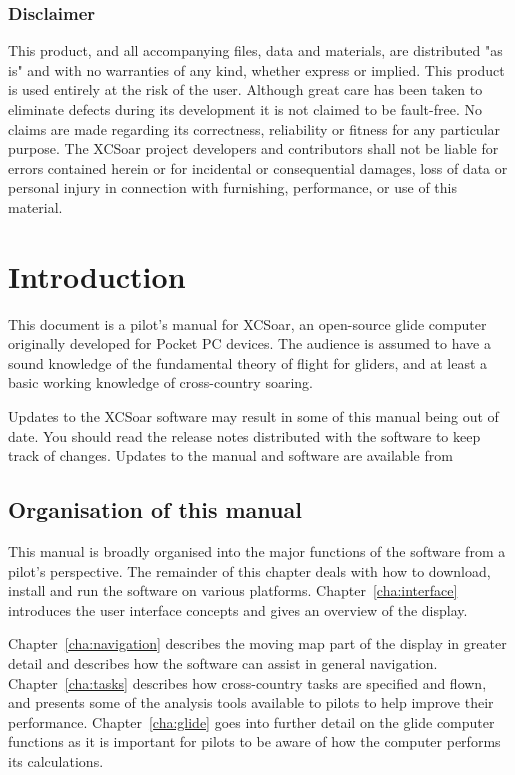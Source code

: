 \documentclass[a4paper,12pt]{refrep}
\begin{document}
\subsection*{Disclaimer}

This product, and all accompanying files, data and materials, are
distributed "as is" and with no warranties of any kind, whether
express or implied.  This product is used entirely at the risk of the
user.  Although great care has been taken to eliminate defects during
its development it is not claimed to be fault-free. No claims are made
regarding its correctness, reliability or fitness for any particular
purpose.  The XCSoar project developers and contributors shall not be
liable for errors contained herein or for incidental or consequential
damages, loss of data or personal injury in connection with
furnishing, performance, or use of this material.


\chapter{Introduction}\label{cha:introduction}
This document is a pilot's manual for XCSoar, an open-source glide
computer originally developed for Pocket PC devices.  The audience 
is assumed to have a sound knowledge of the fundamental theory of flight for
gliders, and at least a basic working knowledge of cross-country soaring.

Updates to the XCSoar software may result in some of this manual being
out of date. You should read the release notes distributed with the
software to keep track of changes.  Updates to the manual and software
are available from 
\begin{quote}
\xcsoarwebsite
\end{quote}

\section{Organisation of this manual}

This manual is broadly organised into the major functions of the
software from a pilot's perspective.  The remainder of this chapter
deals with how to download, install and run the software on various
platforms.  Chapter~\ref{cha:interface} introduces the user interface
concepts and gives an overview of the display.

Chapter~\ref{cha:navigation} describes the moving map part of the
display in greater detail and describes how the software can assist in
general navigation.  Chapter~\ref{cha:tasks} describes how
cross-country tasks are specified and flown, and presents some of the
analysis tools available to pilots to help improve their performance.
Chapter~\ref{cha:glide} goes into further detail on the glide computer
functions as it is important for pilots to be aware of how the
computer performs its calculations.
\end{document}

